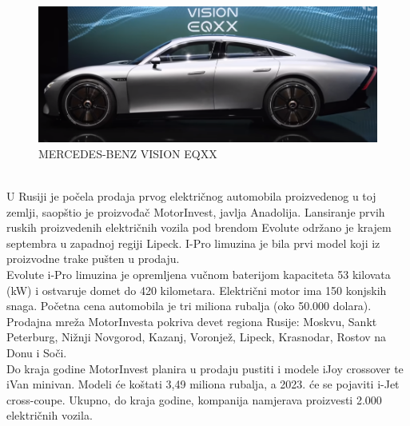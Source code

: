 \documentclass[a4paper]{article}
\begin{document}
\begin{figure}[h]
        \centering
        \includegraphics[width=\linewidth]{Vision.png}
        \caption{MERCEDES-BENZ VISION EQXX}
        \label{fig:my_label3}
        \end{figure}


\newpage

\\

    U Rusiji je počela prodaja prvog električnog automobila proizvedenog u toj zemlji, saopštio je proizvođač MotorInvest, javlja Anadolija. Lansiranje prvih ruskih proizvedenih električnih vozila pod brendom Evolute održano je krajem septembra u zapadnoj regiji Lipeck. I-Pro limuzina je bila prvi model koji iz proizvodne trake pušten u prodaju.\\
    Evolute i-Pro limuzina je opremljena vučnom baterijom kapaciteta 53 kilovata (kW) i ostvaruje domet do 420 kilometara. Električni motor ima 150 konjskih snaga.
    Početna cena automobila je tri miliona rubalja (oko 50.000 dolara). Prodajna mreža MotorInvesta pokriva devet regiona Rusije: Moskvu, Sankt Peterburg, Nižnji Novgorod, Kazanj, Voronjež, Lipeck, Krasnodar, Rostov na Donu i Soči.\\
    Do kraja godine MotorInvest planira u prodaju pustiti i modele iJoy crossover te iVan minivan. Modeli će koštati 3,49 miliona rubalja, a 2023. će se pojaviti i-Jet cross-coupe. Ukupno, do kraja godine, kompanija namjerava proizvesti 2.000 električnih vozila.\\ 

\newpage

\\
\end{document}
